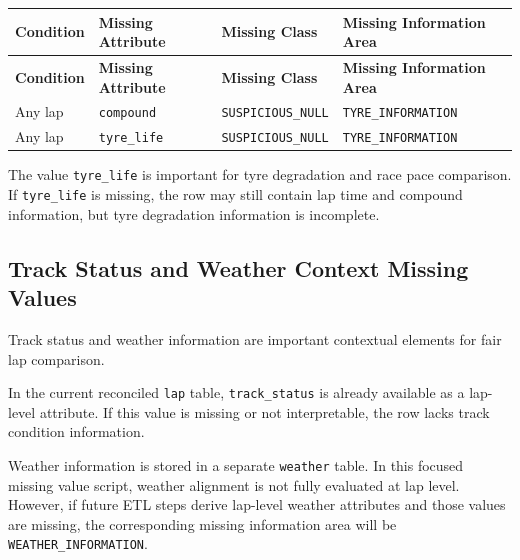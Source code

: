 \documentclass[a4paper,11pt]{article}
\begin{document}
	\begin{longtable}{p{4.5cm}p{4cm}p{3.5cm}p{4cm}}
		\toprule
		\textbf{Condition} & \textbf{Missing Attribute} & \textbf{Missing Class} & \textbf{Missing Information Area} \\
		\midrule
		\endfirsthead
		
		\toprule
		\textbf{Condition} & \textbf{Missing Attribute} & \textbf{Missing Class} & \textbf{Missing Information Area} \\
		\midrule
		\endhead
		
		Any lap
		& \texttt{compound}
		& \texttt{SUSPICIOUS\_NULL}
		& \texttt{TYRE\_INFORMATION} \\
		\midrule
		
		Any lap
		& \texttt{tyre\_life}
		& \texttt{SUSPICIOUS\_NULL}
		& \texttt{TYRE\_INFORMATION} \\
		\bottomrule
	\end{longtable}
	
	The value \texttt{tyre\_life} is important for tyre degradation and race pace comparison.
	If \texttt{tyre\_life} is missing, the row may still contain lap time and compound information, but tyre degradation information is incomplete.
	
	\subsection{Track Status and Weather Context Missing Values}
	
	Track status and weather information are important contextual elements for fair lap comparison.
	
	In the current reconciled \texttt{lap} table, \texttt{track\_status} is already available as a lap-level attribute.
	If this value is missing or not interpretable, the row lacks track condition information.
	
	Weather information is stored in a separate \texttt{weather} table.
	In this focused missing value script, weather alignment is not fully evaluated at lap level.
	However, if future ETL steps derive lap-level weather attributes and those values are missing, the corresponding missing information area will be \texttt{WEATHER\_INFORMATION}.
	
\end{document}

